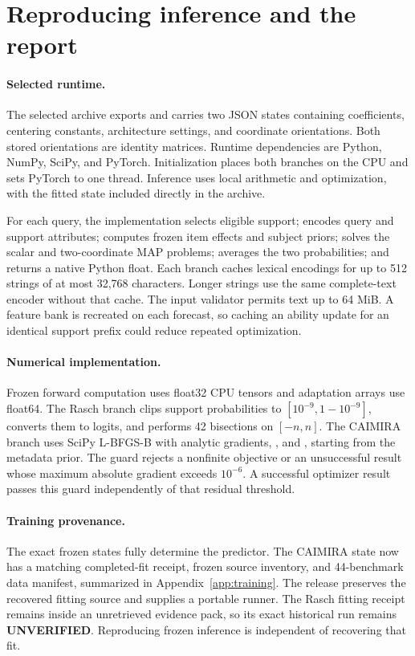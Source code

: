 \section{Reproducing inference and the report}
\label{app:reproduction}
\paragraph{Selected runtime.}
The selected archive exports  and carries two JSON states containing coefficients, centering constants, architecture settings, and coordinate orientations. Both stored orientations are identity matrices. Runtime dependencies are Python, NumPy, SciPy, and PyTorch. Initialization places both branches on the CPU and sets PyTorch to one thread. Inference uses local arithmetic and optimization, with the fitted state included directly in the archive.

For each query, the implementation selects eligible support; encodes query and support attributes; computes frozen item effects and subject priors; solves the scalar and two-coordinate MAP problems; averages the two probabilities; and returns a native Python float. Each branch caches lexical encodings for up to 512 strings of at most 32,768 characters. Longer strings use the same complete-text encoder without that cache. The input validator permits text up to 64 MiB. A feature bank is recreated on each forecast, so caching an ability update for an identical support prefix could reduce repeated optimization.

\paragraph{Numerical implementation.}
Frozen forward computation uses float32 CPU tensors and adaptation arrays use float64. The Rasch branch clips support probabilities to $[10^{-9},1-10^{-9}]$, converts them to logits, and performs 42 bisections on $[-n,n]$. The CAIMIRA branch uses SciPy L-BFGS-B with analytic gradients, , and , starting from the metadata prior. The guard rejects a nonfinite objective or an unsuccessful result whose maximum absolute gradient exceeds $10^{-6}$. A successful optimizer result passes this guard independently of that residual threshold.

\paragraph{Training provenance.}
The exact frozen states fully determine the predictor. The CAIMIRA state now has a matching completed-fit receipt, frozen source inventory, and 44-benchmark data manifest, summarized in Appendix~\ref{app:training}. The release preserves the recovered fitting source and supplies a portable runner. The Rasch fitting receipt remains inside an unretrieved evidence pack, so its exact historical run remains \textbf{UNVERIFIED}. Reproducing frozen inference is independent of recovering that fit.

